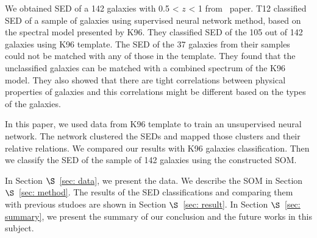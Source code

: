 We obtained SED of a 142 galaxies with 0.5 < $z$ < 1 from~\citet[][hereafter T12]{Hossein12} paper.
T12 classified SED of a sample of galaxies using supervised neural network method, based on the spectral model presented by K96.
They classified SED of the 105 out of 142 galaxies using K96 template. 
The SED of the 37 galaxies from their samples could not be matched with any of those in the template. 
They found that the unclassified galaxies can be matched with a combined spectrum of the K96 model. 
They also showed that there are tight correlations between physical properties of galaxies and this correlations might be different based on the types of the galaxies.

In this paper, we used data from K96 template to train an unsupervised neural network.
The network clustered the SEDs and mapped those clusters and their relative relations.
We compared our results with K96 galaxies classification.
Then we classify the SED of the sample of 142 galaxies using the constructed SOM.
 
 In Section $\S$~\ref{sec: data}, we present the data. We describe the SOM in Section $\S$~\ref{sec: method}. The results of the SED classifications and comparing them with previous studoes are shown in Section $\S$~\ref{sec: result}. In Section $\S$~\ref{sec: summary}, we present the summary of our conclusion and the future works in this subject.

